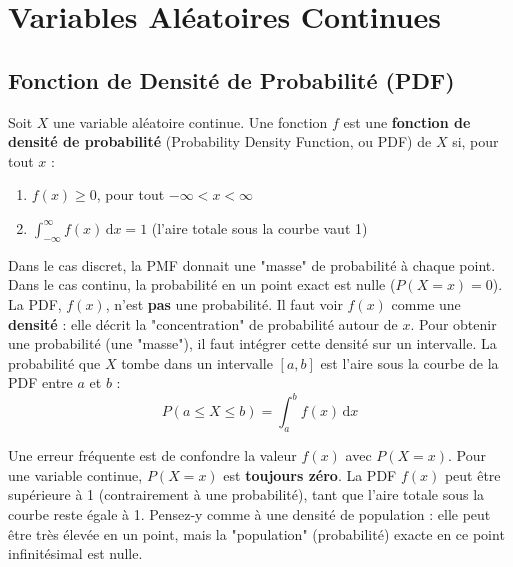 \newpage

\section{Variables Aléatoires Continues}

\subsection{Fonction de Densité de Probabilité (PDF)}

\begin{definitionbox}
Soit $X$ une variable aléatoire continue. Une fonction $f$ est une \textbf{fonction de densité de probabilité} (Probability Density Function, ou PDF) de $X$ si, pour tout $x$ :
\begin{enumerate}
    \item $f(x) \ge 0$, pour tout $-\infty < x < \infty$
    \item $\int_{-\infty}^{\infty} f(x) \, \mathrm{d}x = 1$ (l'aire totale sous la courbe vaut 1)
\end{enumerate}
\end{definitionbox}

\begin{intuitionbox}
Dans le cas discret, la PMF donnait une "masse" de probabilité à chaque point. Dans le cas continu, la probabilité en un point exact est nulle ($P(X=x)=0$). La PDF, $f(x)$, n'est \textbf{pas} une probabilité.
\newline
Il faut voir $f(x)$ comme une \textbf{densité} : elle décrit la "concentration" de probabilité autour de $x$. Pour obtenir une probabilité (une "masse"), il faut intégrer cette densité sur un intervalle. La probabilité que $X$ tombe dans un intervalle $[a, b]$ est l'aire sous la courbe de la PDF entre $a$ et $b$ :
$$ P(a \le X \le b) = \int_a^b f(x) \, \mathrm{d}x $$
\end{intuitionbox}

\begin{remarquebox}
Une erreur fréquente est de confondre la valeur $f(x)$ avec $P(X=x)$. Pour une variable continue, $P(X=x)$ est \textbf{toujours zéro}. La PDF $f(x)$ peut être supérieure à 1 (contrairement à une probabilité), tant que l'aire totale sous la courbe reste égale à 1. Pensez-y comme à une densité de population : elle peut être très élevée en un point, mais la "population" (probabilité) exacte en ce point infinitésimal est nulle.
\end{remarquebox}

